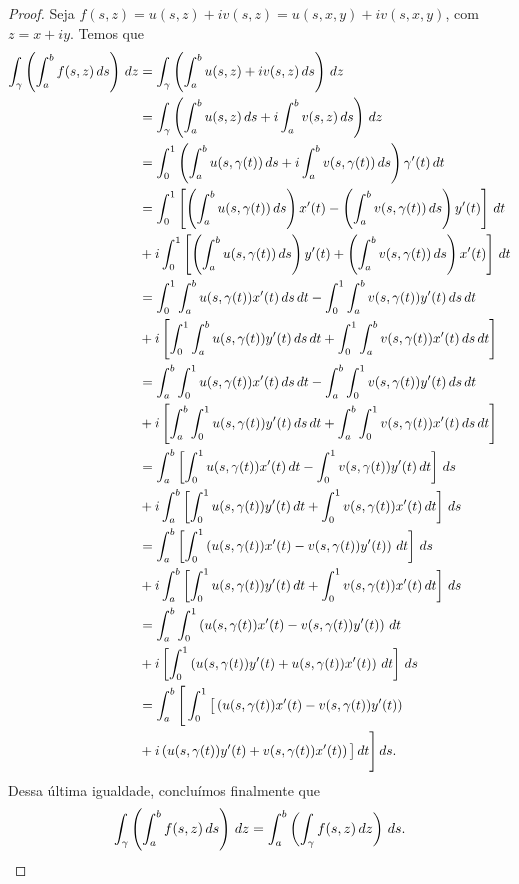 \begin{proof}
Seja $f(s, z) = u(s, z) + iv(s, z) = u(s, x, y) + iv(s, x, y)$, com $z = x+iy$. Temos que
%
\begin{align*}
    \int_{\gamma} \left( \int_a^b f(s,z) \, ds \right) \, dz 
    &= \int_{\gamma} \left( \int_a^b u(s,z) + iv(s,z) \, ds \right) \, dz \\
    &= \int_{\gamma} \left( \int_a^b u(s,z) \, ds + i\int_a^b v(s,z) \, ds \right) \, dz \\
    &= \int_0^1 \left( \int_a^b u(s,\gamma(t)) \, ds + i\int_a^b v(s,\gamma(t)) \, ds \right) \gamma'(t) \, dt \\
    &= \int_0^1 \left[ 
    \left( \int_a^b u(s,\gamma(t)) \, ds \right) x'(t) 
    - \left( \int_a^b v(s,\gamma(t)) \, ds \right) y'(t) 
    \right] \, dt \\
    &+
    i\int_0^1 \left[ 
    \left( \int_a^b u(s,\gamma(t)) \, ds \right) y'(t) 
    + \left( \int_a^b v(s,\gamma(t)) \, ds \right) x'(t) 
    \right] \, dt \\
    &= \int_0^1\int_a^b u(s,\gamma(t)) x'(t) \, ds \, dt 
    - \int_0^1\int_a^b v(s,\gamma(t)) y'(t) \, ds \, dt \\
    &+ i\left[
    \int_0^1\int_a^b u(s,\gamma(t)) y'(t) \, ds \, dt
    + \int_0^1\int_a^b v(s,\gamma(t)) x'(t) \, ds \, dt
    \right] \\
    &= \int_a^b\int_0^1 u(s,\gamma(t)) x'(t) \, ds \, dt 
    - \int_a^b\int_0^1 v(s,\gamma(t)) y'(t) \, ds \, dt \\
    &+ i\left[
    \int_a^b\int_0^1 u(s,\gamma(t)) y'(t) \, ds \, dt
    + \int_a^b\int_0^1 v(s,\gamma(t)) x'(t) \, ds \, dt
    \right] \\
    &= \int_a^b\left[
    \int_0^1 u(s,\gamma(t)) x'(t) \, dt - \int_0^1 v(s,\gamma(t)) y'(t) \, dt
    \right] \, ds \\
    &+ i\int_a^b\left[
    \int_0^1 u(s,\gamma(t)) y'(t) \, dt + \int_0^1 v(s,\gamma(t)) x'(t) \, dt
    \right] \, ds \\
    &= \int_a^b\left[
    \int_0^1 \left( u(s,\gamma(t)) x'(t) - v(s,\gamma(t)) y'(t) \right) \, dt 
    \right] \, ds \\
    &+ i\int_a^b\left[
    \int_0^1 u(s,\gamma(t)) y'(t) \, dt + \int_0^1 v(s,\gamma(t)) x'(t) \, dt
    \right] \, ds \\
    &= \int_a^b
    \int_0^1 \left( u(s,\gamma(t)) x'(t) - v(s,\gamma(t)) y'(t) \right) \, dt \\
    &+ i\left[
    \int_0^1 \left( u(s,\gamma(t)) y'(t) + u(s,\gamma(t)) x'(t) \right) \, dt
    \right] \, ds \\
    &= \int_a^b \Bigg[ \int_0^1 \big[
    \left( u(s,\gamma(t)) x'(t) - v(s,\gamma(t)) y'(t) \right) \\
    &+ i\left( u(s,\gamma(t)) y'(t) + v(s,\gamma(t)) x'(t) \right) \big] \, dt \Bigg] \, ds.
\end{align*}
%
Dessa última igualdade, concluímos finalmente que
%
\[
\int_{\gamma} \left( \int_a^b f(s,z) \, ds \right) \, dz 
= \int_a^b \left( \int_{\gamma} f(s,z) \, dz \right) \, ds.
\]
%
\end{proof}
